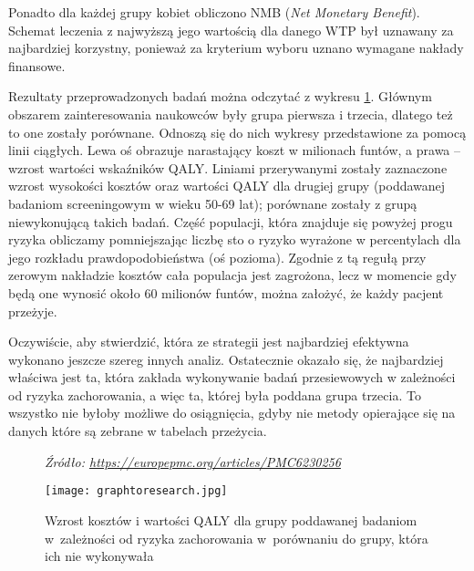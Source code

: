 \documentclass[licencjacka]{pwr_wmat_praca_dyplomowa}
\theoremstyle{plain}
\numberwithin{theorem}{chapter}
\theoremstyle{definition}
\numberwithin{theorem}{chapter}
\begin{document}
Ponadto dla każdej grupy kobiet obliczono NMB (\textit{Net Monetary Benefit}). Schemat leczenia z najwyższą jego wartością dla danego WTP był uznawany za najbardziej korzystny, ponieważ za kryterium wyboru uznano wymagane nakłady finansowe.


Rezultaty przeprowadzonych badań można odczytać z wykresu \ref{rys2}. Głównym obszarem zainteresowania naukowców były grupa pierwsza i trzecia, dlatego też to one zostały porównane. Odnoszą się do nich wykresy przedstawione za pomocą linii ciągłych. Lewa oś obrazuje narastający koszt w milionach funtów, a prawa -- wzrost wartości wskaźników QALY. Liniami przerywanymi zostały zaznaczone wzrost wysokości kosztów oraz wartości QALY dla drugiej grupy (poddawanej badaniom screeningowym w wieku 50-69 lat); porównane zostały z grupą niewykonującą takich badań. Część populacji, która znajduje się powyżej progu ryzyka obliczamy pomniejszając liczbę sto o ryzyko wyrażone w percentylach dla jego rozkładu prawdopodobieństwa (oś pozioma). Zgodnie z tą regułą przy zerowym nakładzie kosztów cała populacja jest zagrożona, lecz w momencie gdy będą one wynosić około 60 milionów funtów, można założyć, że każdy pacjent przeżyje.

Oczywiście, aby stwierdzić, która ze strategii jest najbardziej efektywna wykonano jeszcze szereg innych analiz. Ostatecznie okazało się, że najbardziej właściwa jest ta, która zakłada wykonywanie badań przesiewowych w zależności od ryzyka zachorowania, a więc ta, której była poddana grupa trzecia. To wszystko nie byłoby możliwe do osiągnięcia, gdyby nie metody opierające się na danych które są zebrane w tabelach przeżycia.

\begin{figure}[!hb]
	\caption*{\textit{Źródło: \url{https://europepmc.org/articles/PMC6230256}}}
	\centering
	
	\texttt{[image: graphtoresearch.jpg]}
	\caption{Wzrost kosztów i wartości QALY dla grupy poddawanej badaniom w~zależności od ryzyka zachorowania w~porównaniu do grupy, która ich nie wykonywała}\label{rys2}
	
\end{figure}

\end{document}
